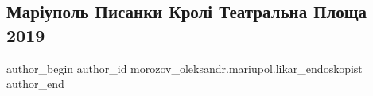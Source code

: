  
 
 
 
 

\subsection{Маріуполь Писанки Кролі Театральна Площа 2019}
\label{sec:27_04_2019.fb.morozov_oleksandr.mariupol.likar_endoskopist.1.foto_velykden_2019_without_title}

\ifcmt
 author_begin
   author_id morozov_oleksandr.mariupol.likar_endoskopist
 author_end
\fi
